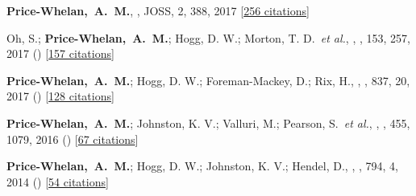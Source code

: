 \item[{\color{deemph}\scriptsize5}]\textbf{Price-Whelan,~A.~M.}, , JOSS, 2, 388, 2017 [\href{http://adsabs.harvard.edu/abs/2017JOSS....2..388P}{256 citations}]

\item[{\color{deemph}\scriptsize4}]Oh, S.; \textbf{Price-Whelan,~A.~M.}; Hogg, D. W.; Morton, T. D.~\textit{et al.}, , \aj, 153, 257, 2017 () [\href{http://adsabs.harvard.edu/abs/2017AJ....153..257O}{157 citations}]

\item[{\color{deemph}\scriptsize3}]\textbf{Price-Whelan,~A.~M.}; Hogg, D. W.; Foreman-Mackey, D.; Rix, H., , \apj, 837, 20, 2017 () [\href{http://adsabs.harvard.edu/abs/2017ApJ...837...20P}{128 citations}]

\item[{\color{deemph}\scriptsize2}]\textbf{Price-Whelan,~A.~M.}; Johnston, K. V.; Valluri, M.; Pearson, S.~\textit{et al.}, , \mnras, 455, 1079, 2016 () [\href{http://adsabs.harvard.edu/abs/2016MNRAS.455.1079P}{67 citations}]

\item[{\color{deemph}\scriptsize1}]\textbf{Price-Whelan,~A.~M.}; Hogg, D. W.; Johnston, K. V.; Hendel, D., , \apj, 794, 4, 2014 () [\href{http://adsabs.harvard.edu/abs/2014ApJ...794....4P}{54 citations}]
